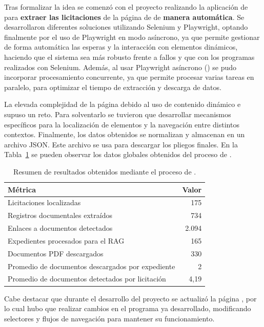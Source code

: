 Tras formalizar la idea se comenzó con el proyecto realizando la aplicación de  para \textbf{extraer las licitaciones} de la página de \contsec{} de \textbf{manera automática}. Se desarrollaron diferentes soluciones utilizando Selenium y Playwright, optando finalmente por el uso de Playwright en modo asíncrono, ya que permite gestionar de forma automática las esperas y la interacción con elementos dinámicos, haciendo que el sistema sea más robusto frente a fallos y  que con los programas realizados con Selenium. Además, al usar Playwright asíncrono () se pudo incorporar procesamiento concurrente, ya que permite procesar varias tareas en paralelo, para optimizar el tiempo de extracción y descarga de datos. 

La elevada complejidad de la página debido al uso de contenido dinámico e  supuso un reto. Para solventarlo se tuvieron que desarrollar mecanismos específicos para la localización de elementos y la navegación entre distintos contextos. Finalmente, los datos obtenidos se normalizan y almacenan en un archivo JSON. Este archivo se usa para descargar los pliegos finales. En la Tabla~\ref{tabla:webscraping_resultados} se pueden observar los datos globales obtenidos del proceso de .

\begin{table}[p]
\centering
\begin{tabularx}{\linewidth}{p{} r}
\toprule
\textbf{Métrica} & \textbf{Valor} \\
\midrule
Licitaciones localizadas & 175 \\
Registros documentales extraídos & 734 \\
Enlaces a documentos detectados & 2.094 \\
Expedientes procesados para el RAG & 165 \\
Documentos PDF descargados & 330 \\
Promedio de documentos descargados por expediente & 2 \\
Promedio de documentos detectados por licitación & 4,19 \\
\bottomrule
\end{tabularx}
\caption{Resumen de resultados obtenidos mediante el proceso de .}
\label{tabla:webscraping_resultados}
\end{table}

Cabe destacar que durante el desarrollo del proyecto se actualizó la página \contsec{}, por lo cual hubo que realizar cambios en el programa ya desarrollado, modificando selectores y flujos de navegación para mantener su funcionamiento.

